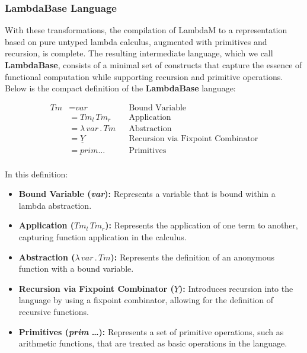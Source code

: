 \documentclass{IEEEtran}
\begin{document}

\subsubsection{LambdaBase Language}

\par With these transformations, the compilation of LambdaM to a representation based on pure untyped lambda calculus, augmented with primitives and recursion, is complete. The resulting intermediate language, which we call \textbf{LambdaBase}, consists of a minimal set of constructs that capture the essence of functional computation while supporting recursion and primitive operations. Below is the compact definition of the \textbf{LambdaBase} language:

\begin{align*}
Tm &=  \textit{var} && \text{Bound Variable} \\
   &=  Tm_l \, Tm_r && \text{Application} \\
   &=  \lambda \, \textit{var} \, . \, Tm && \text{Abstraction} \\
   &=  \underline{Y} && \text{Recursion via Fixpoint Combinator} \\
   &=  \textit{prim} \dots && \text{Primitives} \\
\end{align*}

\begingroup
\vspace*{-\baselineskip}
\vspace*{\baselineskip}
\endgroup

\par In this definition:
\begin{itemize}
    \item \textbf{Bound Variable (\textit{var}):} Represents a variable that is bound within a lambda abstraction.
    \item \textbf{Application ($Tm_l \, Tm_r$):} Represents the application of one term to another, capturing function application in the calculus.
    \item \textbf{Abstraction ($\lambda \, \textit{var} \, . \, Tm$):} Represents the definition of an anonymous function with a bound variable.
    \item \textbf{Recursion via Fixpoint Combinator ($\underline{Y}$):} Introduces recursion into the language by using a fixpoint combinator, allowing for the definition of recursive functions.
    \item \textbf{Primitives (\textit{prim} \dots):} Represents a set of primitive operations, such as arithmetic functions, that are treated as basic operations in the language.
\end{itemize}
\end{document}
